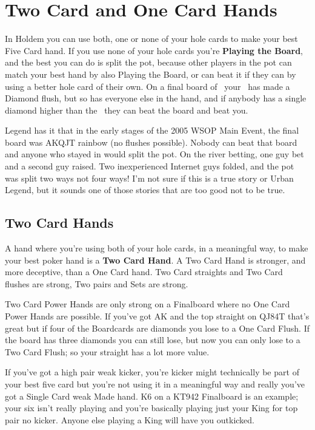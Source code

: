 \chapter{Two Card and One Card Hands}


In Holdem you can use both, one or none of your hole cards to make your
best Five Card hand. If you use none of your hole cards you're
\textbf{Playing the Board}, and the best you can do is split the
pot, because other players in the pot can match your best hand by also
Playing the Board, or can beat it if they can by using a better hole
card of their own. On a final board of \Ad\nined\eigd\Jd\sixd\ your
\Qc\Qs\ has made a Diamond flush, but so has everyone else in the hand,
and if anybody has a single diamond higher than the \sixd\ they can
beat the board and beat you.

Legend has it that in the early stages of the 2005 WSOP Main Event,
the final board was AKQJT rainbow (no flushes possible). Nobody can
beat that board and anyone who stayed in would split the pot. On the
river betting, one guy bet and a second guy raised. Two inexperienced
Internet guys folded, and the pot was split two ways not four ways!
I'm not sure if this is a true story or Urban Legend, but it sounds
one of those stories that are too good not to be true.

\section{Two Card Hands}

A hand where you're using both of your hole cards, in a meaningful
way, to make your best poker hand is a \textbf{Two Card
Hand}. A Two Card Hand is stronger, and more deceptive, than a
One Card hand. Two Card straights and Two Card flushes are
strong, Two pairs and Sets are strong.

Two Card Power Hands are only strong on a Finalboard where no
One Card Power Hands are possible. If you've got AK and the top
straight on QJ84T that's great but if four of the Boardcards are
diamonds you lose to a One Card Flush. If the board has three
diamonds you can still lose, but now you can only lose to a Two
Card Flush; so your straight has a lot more value.

If you've got a high pair weak kicker, you're kicker might technically
be part of your best five card but you're not using it in a meaningful
way and really you've got a Single Card weak Made hand. K6 on a KT942
Finalboard is an example; your six isn't really playing and you're
basically playing just your King for top pair no kicker. Anyone else
playing a King will have you outkicked.

